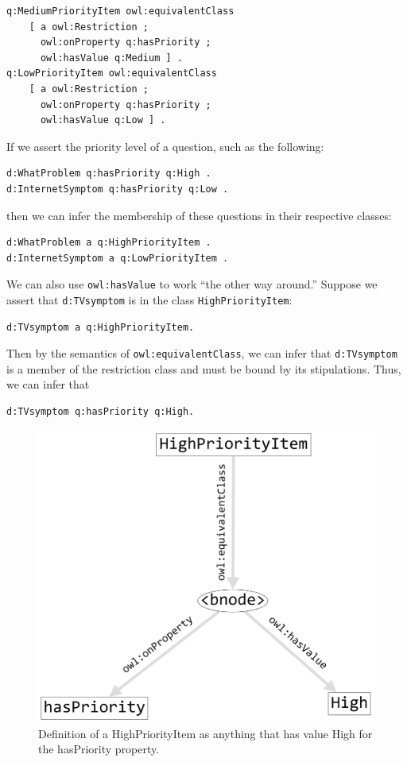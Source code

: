 \begin{lstlisting}
q:MediumPriorityItem owl:equivalentClass
    [ a owl:Restriction ;
      owl:onProperty q:hasPriority ;
      owl:hasValue q:Medium ] .
q:LowPriorityItem owl:equivalentClass 
    [ a owl:Restriction ;
      owl:onProperty q:hasPriority ;
      owl:hasValue q:Low ] .
\end{lstlisting}

If we assert the priority level of a question, such as the following:

\begin{lstlisting}
d:WhatProblem q:hasPriority q:High .
d:InternetSymptom q:hasPriority q:Low .
\end{lstlisting}

then we can infer the membership of these questions in their respective
classes:

\begin{lstlisting}
d:WhatProblem a q:HighPriorityItem .
d:InternetSymptom a q:LowPriorityItem .
\end{lstlisting}

We can also use \texttt{owl:hasValue} to work ``the other way around.'' Suppose
we assert that \texttt{d:TVsymptom} is in the class \texttt{HighPriorityItem}:


\begin{lstlisting}
d:TVsymptom a q:HighPriorityItem.
\end{lstlisting}

Then by the semantics of \texttt{owl:equivalentClass}, we can infer that
\texttt{d:TVsymptom} is a member of the restriction class and must be bound by
its stipulations. Thus, we can infer that

\begin{lstlisting}
d:TVsymptom q:hasPriority q:High.
\end{lstlisting}


\begin{figure}
\centering
\includegraphics[width=5in]{SWWOv3/media/ch12/figure12-8.png}
\caption{Definition of a HighPriorityItem as anything that has value High for the
hasPriority property.
}
\label{fig:ch12.08}
\end{figure}



